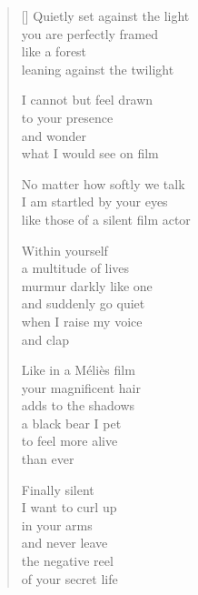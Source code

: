 \documentclass[12pt,a4paper]{article}
\begin{document}
\begin{verse}[\versewidth]
Quietly set against the light \\
you are perfectly framed \\
like a forest \\
leaning against the twilight

I cannot but feel drawn \\
to your presence \\
and wonder \\
what I would see on film

No matter how softly we talk \\
I am startled by your eyes \\
like those of a silent film actor

Within yourself \\
a multitude of lives \\
murmur darkly like one \\
and suddenly go quiet \\
when I raise my voice \\
and clap

Like in a Méliès film \\
your magnificent hair \\
adds to the shadows \\
a black bear I pet \\
to feel more alive \\
than ever

Finally silent \\
I want to curl up \\
in your arms \\
and never leave \\
the negative reel \\
of your secret life
\end{verse}
\end{document}
